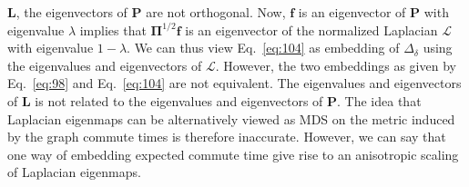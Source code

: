 $\mathbf{L}$, the eigenvectors of $\mathbf{P}$ are not
orthogonal. Now, $\mathbf{f}$ is an eigenvector of $\mathbf{P}$ with
eigenvalue $\lambda$ implies that $\bm{\Pi}^{1/2}\mathbf{f}$ is an
eigenvector of the normalized Laplacian $\bm{\mathcal{L}}$ with
eigenvalue $1 - \lambda$. We can thus view Eq.~\eqref{eq:104} as
embedding of $\Delta_\delta$ using the eigenvalues and eigenvectors of
$\bm{\mathcal{L}}$. However, the two embeddings as given by
Eq.~\eqref{eq:98} and Eq.~\eqref{eq:104} are not equivalent. The
eigenvalues and eigenvectors of $\mathbf{L}$ is not related to the
eigenvalues and eigenvectors of $\mathbf{P}$. The idea that Laplacian
eigenmaps can be alternatively viewed as MDS on the metric induced by
the graph commute times \citep{saul06:_semis} is therefore
inaccurate. However, we can say that one way of embedding expected
commute time give rise to an anisotropic scaling of Laplacian
eigenmaps.
